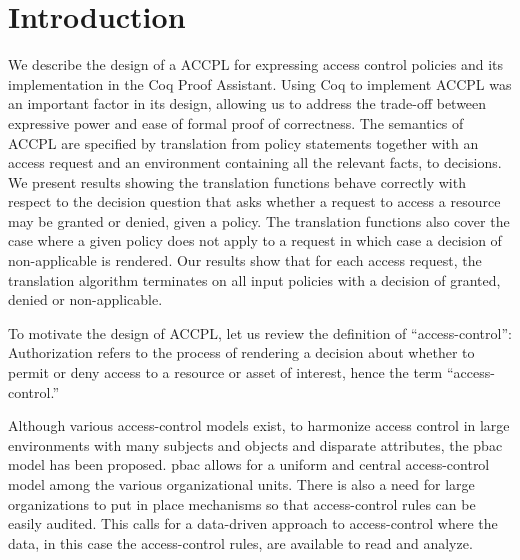\documentclass[runningheads,a4paper]{llncs}
\begin{document}
\section{Introduction}\label{sec:intro}
We describe the design of a \ac{ACCPL} 
for expressing access control policies
%
and its implementation in the
Coq Proof Assistant. Using Coq to implement \ac{ACCPL} was an
important factor in its design, allowing us to address the trade-off
between expressive power and ease of formal proof of correctness.
The semantics of \ac{ACCPL} are specified by translation from policy
statements together with an access request and an environment
containing all the relevant facts, to decisions. We present results
showing the translation functions behave correctly with respect to the
decision question that asks whether a request to access a resource may
be granted or denied, given a policy. The translation functions also
cover the case where a given policy does not apply to a request in
which case a decision of non-applicable is rendered. Our results show
that for each access request, the translation algorithm terminates on
all input policies with a decision of granted, denied or
non-applicable.

To motivate the design of \ac{ACCPL}, let us review the definition of
``access-control'': Authorization refers to the process of rendering a
decision about whether to permit or deny access to a resource or asset
of interest, hence the term ``access-control.''

Although various access-control models exist, to harmonize access control in large environments with many subjects and objects and disparate attributes, the \ac{pbac}~\cite{nist} model has been proposed. \ac{pbac} allows for a uniform and central access-control model among the various organizational units. There is also a need for large organizations to put in place mechanisms so that access-control rules can be easily audited. This calls for a data-driven approach to access-control where the data, in this case the access-control rules, are available to read and analyze. 
\end{document}
